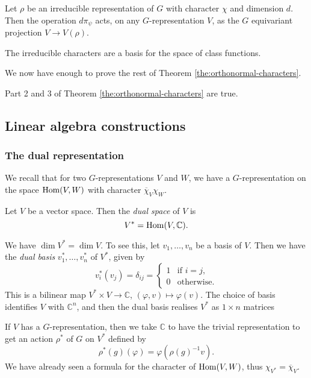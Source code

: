\begin{corollary}
    Let $\rho$ be an irreducible representation of $G$ with character $\chi$ and dimension $d$. Then the operation $d\pi_\psi$ acts, on any $G$-representation $V$, as the $G$ equivariant projection $V \to V(\rho)$.
\end{corollary}

\begin{corollary}
    The irreducible characters are a basis for the space of class functions.
\end{corollary}

We now have enough to prove the rest of Theorem \ref{the:orthonormal-characters}.

\begin{corollary}
    Part 2 and 3 of Theorem \ref{the:orthonormal-characters} are true.
\end{corollary}

\subsection{Linear algebra constructions}

\subsubsection{The dual representation}

We recall that for two $G$-representations $V$ and $W$, we have a $G$-representation on the space $\operatorname{Hom}(V,W)$ with character $\overline\chi_V\chi_W$.

\begin{definition}
    Let $V$ be a vector space. Then the \emph{dual space} of $V$ is
    \[ V^* = \operatorname{Hom}(V, \mathbb C). \]
\end{definition}

We have $\dim V^* = \dim V$. To see this, let $v_1, \ldots, v_n$ be a basis of $V$. Then we have the \emph{dual basis} $v_1^*, \ldots, v_n^*$ of $V^*$, given by
\[ v_i^*(v_j) = \delta_{ij} = \begin{cases}
        1 & \text{if $i = j$}, \\
        0 & \text{otherwise}.
    \end{cases} \]
This is a bilinear map $V^* \times V \to \mathbb C$, $(\varphi, v) \mapsto \varphi(v)$. The choice of basis identifies $V$ with $\mathbb C^n$, and then the dual basis realises $V^*$ as $1 \times n$ matrices

If $V$ has a $G$-representation, then we take $\mathbb C$ to have the trivial representation to get an action $\rho^*$ of $G$ on $V^*$ defined by
\[ \rho^*(g)(\varphi) = \varphi(\rho(g)^{-1}v). \]
We have already seen a formula for the character of $\operatorname{Hom}(V,W)$, thus $\chi_{V^*} = \overline\chi_V$.

